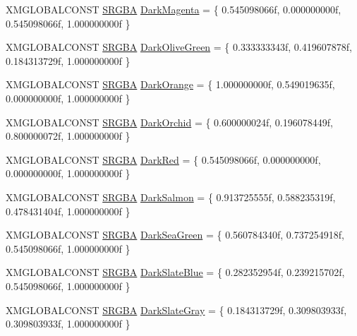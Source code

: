 \begin{DoxyCompactItemize}
\item 
X\+M\+G\+L\+O\+B\+A\+L\+C\+O\+N\+ST \hyperlink{structmage_1_1_s_r_g_b_a}{S\+R\+G\+BA} \hyperlink{namespacemage_1_1color_aa62226b72ae58ea0ff91983dab110de9}{Dark\+Magenta} = \{ 0.\+545098066f, 0.\+000000000f, 0.\+545098066f, 1.\+000000000f \}
\item 
X\+M\+G\+L\+O\+B\+A\+L\+C\+O\+N\+ST \hyperlink{structmage_1_1_s_r_g_b_a}{S\+R\+G\+BA} \hyperlink{namespacemage_1_1color_a6776b45c4cae8936bb265170076396fa}{Dark\+Olive\+Green} = \{ 0.\+333333343f, 0.\+419607878f, 0.\+184313729f, 1.\+000000000f \}
\item 
X\+M\+G\+L\+O\+B\+A\+L\+C\+O\+N\+ST \hyperlink{structmage_1_1_s_r_g_b_a}{S\+R\+G\+BA} \hyperlink{namespacemage_1_1color_ada422983b2e1f8c60e4c32ca95f6f985}{Dark\+Orange} = \{ 1.\+000000000f, 0.\+549019635f, 0.\+000000000f, 1.\+000000000f \}
\item 
X\+M\+G\+L\+O\+B\+A\+L\+C\+O\+N\+ST \hyperlink{structmage_1_1_s_r_g_b_a}{S\+R\+G\+BA} \hyperlink{namespacemage_1_1color_abeffe327a3acdb1e4e1d1105ac4c19bf}{Dark\+Orchid} = \{ 0.\+600000024f, 0.\+196078449f, 0.\+800000072f, 1.\+000000000f \}
\item 
X\+M\+G\+L\+O\+B\+A\+L\+C\+O\+N\+ST \hyperlink{structmage_1_1_s_r_g_b_a}{S\+R\+G\+BA} \hyperlink{namespacemage_1_1color_a0b39625542054fdccde9987b40d9de76}{Dark\+Red} = \{ 0.\+545098066f, 0.\+000000000f, 0.\+000000000f, 1.\+000000000f \}
\item 
X\+M\+G\+L\+O\+B\+A\+L\+C\+O\+N\+ST \hyperlink{structmage_1_1_s_r_g_b_a}{S\+R\+G\+BA} \hyperlink{namespacemage_1_1color_a152f961783386c7d35cb945ac89026bd}{Dark\+Salmon} = \{ 0.\+913725555f, 0.\+588235319f, 0.\+478431404f, 1.\+000000000f \}
\item 
X\+M\+G\+L\+O\+B\+A\+L\+C\+O\+N\+ST \hyperlink{structmage_1_1_s_r_g_b_a}{S\+R\+G\+BA} \hyperlink{namespacemage_1_1color_a86d3cd5e64a2e34ba14b9ca697e12b5a}{Dark\+Sea\+Green} = \{ 0.\+560784340f, 0.\+737254918f, 0.\+545098066f, 1.\+000000000f \}
\item 
X\+M\+G\+L\+O\+B\+A\+L\+C\+O\+N\+ST \hyperlink{structmage_1_1_s_r_g_b_a}{S\+R\+G\+BA} \hyperlink{namespacemage_1_1color_adb9fec6b7ccf429dedf44e35a47a82da}{Dark\+Slate\+Blue} = \{ 0.\+282352954f, 0.\+239215702f, 0.\+545098066f, 1.\+000000000f \}
\item 
X\+M\+G\+L\+O\+B\+A\+L\+C\+O\+N\+ST \hyperlink{structmage_1_1_s_r_g_b_a}{S\+R\+G\+BA} \hyperlink{namespacemage_1_1color_a9063445567fdec3ac2f7916b4f1989ef}{Dark\+Slate\+Gray} = \{ 0.\+184313729f, 0.\+309803933f, 0.\+309803933f, 1.\+000000000f \}

\end{DoxyCompactItemize}
